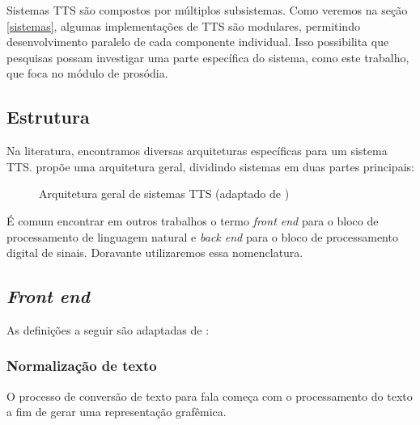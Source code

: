 Sistemas TTS são compostos por múltiplos subsistemas. Como veremos na seção
\ref{sistemas}, algumas implementações de TTS são modulares, permitindo
desenvolvimento paralelo de cada componente individual. Isso possibilita que
pesquisas possam investigar uma parte específica do sistema, como este trabalho,
que foca no módulo de prosódia.

\subsection{Estrutura}
Na literatura, encontramos diversas arquiteturas específicas para um sistema TTS.
 propõe uma arquitetura geral, dividindo sistemas em duas partes principais:

\begin{figure}[!htbp]
\centering
{}
\caption{Arquitetura geral de sistemas TTS (adaptado de )}
\label{fig:tts-arch}
\end{figure}

É comum encontrar em outros trabalhos o termo \emph{front end} para o
bloco de processamento de linguagem natural e \emph{back end} para o bloco de
processamento digital de sinais. Doravante utilizaremos essa nomenclatura.

\subsection{\emph{Front end}}
As definições a seguir são adaptadas de \cite{martinjurafsky}:

\subsubsection{Normalização de texto}
O processo de conversão de texto para fala começa com o processamento do texto a
fim de gerar uma representação grafêmica.

